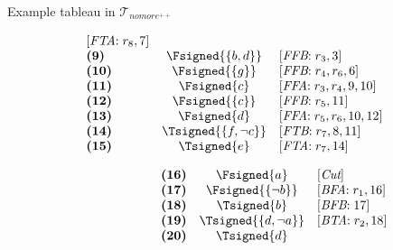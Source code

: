 \begin{frame}{Example tableau in $\mathcal{T}_{\textit{nomore}^{++}}$}
\begin{center}
\begin{minipage}[t]{16cm}
\begin{minipage}[t]{4.5cm}
\[\begin{array}{lcl}
  [\textit{FTA}{:}\;r_8, \text{7}]                 \\
\textbf{(9)}                                       &
  \Fsigned{\{b,d\}}                                &
  [\textit{FFB}{:}\;r_3, \text{3}]                 \\
\textbf{(10)}                                      &
  \Fsigned{\{g\}}                                  &
  [\textit{FFB}{:}\;r_4, r_6, \text{6}]            \\
\textbf{(11)}                                      &
  \Fsigned{c}                                      &
  [\textit{FFA}{:}\;r_3,r_4, \text{9}, \text{10}]  \\
\textbf{(12)}                                      &
  \Fsigned{\{c\}}                                  &
  [\textit{FFB}{:}\;r_5, \text{11}]                \\
\textbf{(13)}                                      &
  \Fsigned{d}                                      &
  [\textit{FFA}{:}\;r_5,r_6, \text{10}, \text{12}] \\
\textbf{(14)}                                      &
  \Tsigned{\{f,\neg c\}}                   &
  [\textit{FTB}{:}\;r_7, \text{8}, \text{11}]      \\
\textbf{(15)}                                      &
  \Tsigned{e}                                      &
  [\textit{FTA}{:}\;r_7, \text{14}]
\end{array}
\]
\end{minipage}
\begin{minipage}[t]{6cm}
\[
\hspace{2.2cm}
\begin{array}{lcl}
\textbf{(16)}                                      &
  \Fsigned{a}                                      &
  [\textit{Cut}]                                   \\
\textbf{(17)}                                      &
  \Fsigned{\{\neg b\}}                     &
  [\textit{BFA}{:}\; r_1, \text{16}]               \\
\textbf{(18)}                                      &
  \Tsigned{b}                                      &
  [\textit{BFB}{:}\; \text{17}]                    \\
\textbf{(19)}                                      &
  \Tsigned{\{d,\neg a\}}                   &
  [\textit{BTA}{:}\;r_2, \text{18}]                \\
\textbf{(20)}                                      &
  \Tsigned{d}                                      &

\end{array}\]
\end{minipage}
\end{minipage}
\end{center}
\end{frame}
